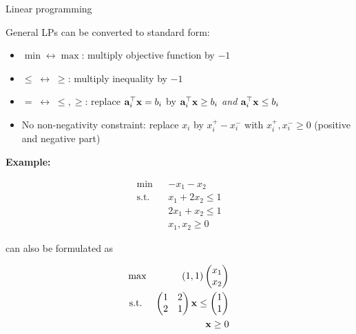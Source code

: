 \documentclass[11pt,compress,t,notes=noshow, xcolor=table]{beamer}
\begin{document}
\begin{vbframe}{Linear programming}
%
%

\framebreak

General LPs can be converted to standard form:

\begin{itemize}
    \setlength{\itemsep}{1em}
    \item $\min \longleftrightarrow \max$: multiply objective function by $-1$
    \item $\leq \; \longleftrightarrow \; \geq$: multiply inequality by $-1$
    \item $= \; \longleftrightarrow \; \leq,\geq$: replace $\mathbf{a}_i^\top\mathbf{x}=b_i$ by $\mathbf{a}_i^\top\mathbf{x}\ge b_i$ \textit{and} $\mathbf{a}_i^\top\mathbf{x}\le b_i$
    \item No non-negativity constraint: replace $x_i$ by $x_i^+ - x_i^-$ with $x_i^+, x_i^- \ge 0$ (positive and negative part)
\end{itemize}


\framebreak

\textbf{Example:}

\vspace{-\baselineskip}

\begin{eqnarray*}
\min && - x_1 - x_2 \\
\text{s.t. } && x_1 + 2x_2 \le 1\\
&& 2x_1 + x_2 \le 1 \\
&& x_1, x_2 \ge 0
\end{eqnarray*}

can also be formulated as

\vspace*{-\baselineskip}

\begin{eqnarray*}
\max && (1, 1) \begin{pmatrix} x_1 \\ x_2 \end{pmatrix} \\
\text{s.t. } &&  \begin{pmatrix}  1 &  2 \\  2 &  1 \end{pmatrix} \mathbf{x} \le \begin{pmatrix}  1 \\  1
\end{pmatrix} \\
&& \mathbf{x} \ge 0
\end{eqnarray*}

\end{vbframe}
\end{document}
